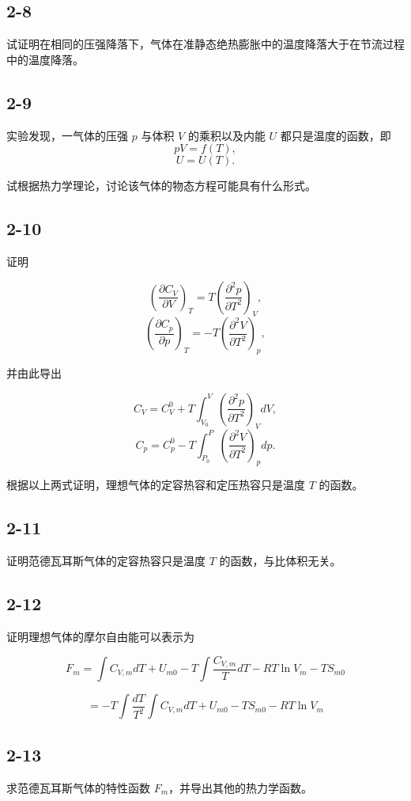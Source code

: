 \newpage
\subsection{2-8}
试证明在相同的压强降落下，气体在准静态绝热膨胀中的温度降落大于在节流过程中的温度降落。

\newpage
\subsection{2-9}
实验发现，一气体的压强 $p$ 与体积 $V$ 的乘积以及内能 $U$ 都只是温度的函数，即
$$pV = f(T),$$
$$U = U(T).$$

试根据热力学理论，讨论该气体的物态方程可能具有什么形式。

\newpage
\subsection{2-10}
证明

$$\left( \frac{\partial C_V}{\partial V} \right)_T = T \left( \frac{\partial^2 p}{\partial T^2} \right)_V,$$
$$\left( \frac{\partial C_p}{\partial p} \right)_T = -T \left( \frac{\partial^2 V}{\partial T^2} \right)_p,$$

并由此导出

$$C_V = C_V^0 + T \int_{V_0}^V \left( \frac{\partial^2 p}{\partial T^2} \right)_V dV,$$
$$C_p = C_p^0 - T \int_{P_0}^P \left( \frac{\partial^2 V}{\partial T^2} \right)_p dp.$$

根据以上两式证明，理想气体的定容热容和定压热容只是温度 $T$ 的函数。

\newpage
\subsection{2-11}
证明范德瓦耳斯气体的定容热容只是温度 $T$ 的函数，与比体积无关。

\newpage
\subsection{2-12}
证明理想气体的摩尔自由能可以表示为

$$F_m = \int C_{V,m} dT + U_{m0} - T \int \frac{C_{V,m}}{T} dT - RT \ln V_m - TS_{m0}$$

$$= - T \int \frac{dT}{T^2} \int C_{V,m} dT + U_{m0} - TS_{m0} - RT \ln V_m$$

\newpage
\subsection{2-13}
求范德瓦耳斯气体的特性函数 $F_m$，并导出其他的热力学函数。

